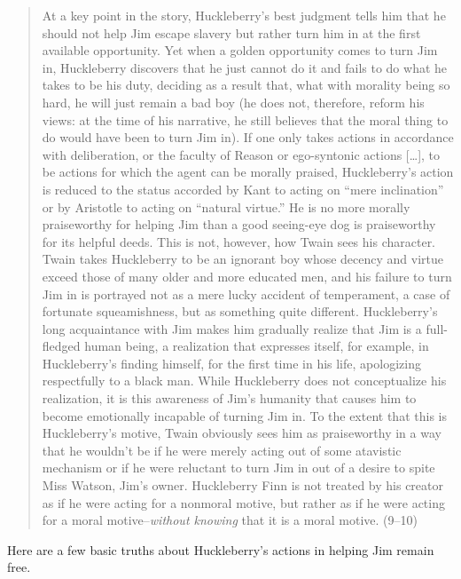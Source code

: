 \begin{quote}
At a key point in the story, \gls{Huck}leberry's best judgment tells him that he should not help Jim escape slavery but rather turn him in at the first available opportunity. Yet when a golden opportunity comes to turn Jim in, \gls{Huck}leberry discovers that he just cannot do it and fails to do what he takes to be his duty, deciding as a result that, what with morality being so hard, he will just remain a bad boy (he does not, therefore, reform his views: at the time of his narrative, he still believes that the moral thing to do would have been to turn Jim in). If one only takes actions in accordance with deliberation, or the faculty of Reason or ego-syntonic actions [{\ldots}], to be actions for which the agent can be morally praised, \gls{Huck}leberry's action is reduced to the status accorded by Kant to acting on ``mere inclination'' or by Aristotle to acting on ``natural virtue.'' He is no more morally praiseworthy for helping Jim than a good seeing-eye dog is praiseworthy for its helpful deeds. This is not, however, how Twain sees his character. Twain takes \gls{Huck}leberry to be an ignorant boy whose decency and virtue exceed those of many older and more educated men, and his failure to turn Jim in is portrayed not as a mere lucky accident of temperament, a case of fortunate squeamishness, but as something quite different. \gls{Huck}leberry's long acquaintance with Jim makes him gradually realize that Jim is a full-fledged human being, a realization that expresses itself, for example, in \gls{Huck}leberry's finding himself, for the first time in his life, apologizing respectfully to a black man. While \gls{Huck}leberry does not conceptualize his realization, it is this awareness of Jim's humanity that causes him to become emotionally incapable of turning Jim in. To the extent that this is \gls{Huck}leberry's motive, Twain obviously sees him as praiseworthy in a way that he wouldn't be if he were merely acting out of some atavistic mechanism or if he were reluctant to turn Jim in out of a desire to spite Miss Watson, Jim's owner. \gls{Huck}leberry Finn is not treated by his creator as if he were acting for a nonmoral motive, but rather as if he were acting for a moral motive--\emph{without knowing} that it is a moral motive. (9--10)
\end{quote}
Here are a few basic truths about \gls{Huck}leberry's actions in helping Jim remain free.

